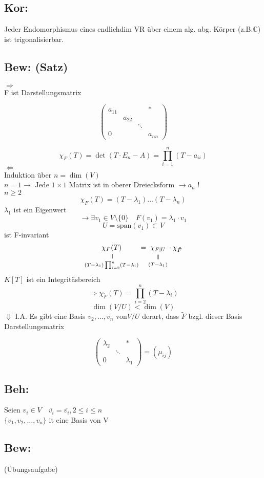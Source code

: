 \documentclass[titlepage,12pt,a4paper,ngerman]{report}
\newcommand{\verteq}{\rotatebox{90}{$\,=$}}
\newcommand{\equalto}[2]{\underset{\scriptstyle\overset{\mkern4mu\verteq}{#2}}{#1}}
\begin{document}
\subsection{Kor:}
Jeder Endomorphismus eines endlichdim VR über einem alg. abg. Körper (z.B.$\mathbb{C}$) ist trigonalisierbar.
\subsection{Bew: (Satz)}
$\Rightarrow$ \\
F ist Darstellungsmatrix 

$$\begin{pmatrix}
a_{11} & & & *\\
& a_{22} & & \\
& & \ddots & \\
0 & & & a_{nn}
\end{pmatrix}$$

$$\chi_F(T) = \det(T\cdot E_n - A) = \prod^n_{i=1} (T-a_{ii})$$
$\Leftarrow$\\ Induktion über $n = \dim(V)$\\
$n=1 \rightarrow$ Jede $1\times 1$ Matrix ist in oberer Dreiecksform $\rightarrow a_n$ !\\
$n\ge 2$
$$\chi_F(T) = (T-\lambda_1) \dots (T-\lambda_n)$$
$\lambda_1$ ist ein Eigenwert 
$$\rightarrow \exists v_1 \in V\setminus \{0\} \quad F(v_1) = \lambda_1 \cdot v_1$$
$$U = \textrm{span}(v_1) \subset V$$
ist F-invariant
$$\equalto{\chi_F(T)}{(T-\lambda_1)\prod^n_{i=2}(T-\lambda_i)} = \equalto{\chi_{F \mid U}}{(T-\lambda_1)} \cdot \chi_{\tilde{F}}$$
$K[T]$ ist ein Integritäsbereich
$$\Rightarrow \chi_{\tilde{F}}(T) = \prod^n_{i=2}(T-\lambda_i)$$
$$\dim(V/U) < \dim(V)$$
$\Downarrow$ I.A.
Es gibt eine Basis $\bar{v_2}, \dots , \bar{v_n}$ von$ V/U$ derart, dass $\tilde{F}$ bzgl. dieser Basis Darstellungsmatrix

$$\begin{pmatrix}
\lambda_2 & & * \\
& \ddots & \\
0 & & \lambda_1
\end{pmatrix} = (\mu_{ij})$$
\subsection{Beh:} Seien $v_i \in V \quad \overline{v_i} = \overline{v_i}, 2 \le i \le n$\\
$\{v_1,v_2,\dots,v_n\}$ it eine Basis von V

\subsection{Bew: } (Übungsaufgabe)
\end{document}
